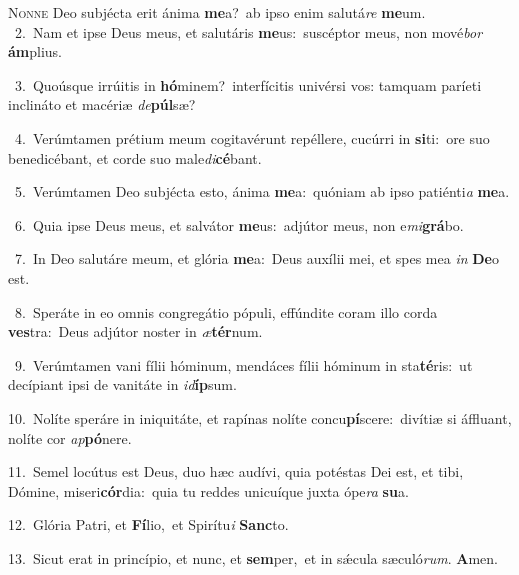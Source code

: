 \lettrine{\initial\textcolor{\initialcolor}{N}}{onne} Deo subjécta erit ánima \textbf{me}\-a?~\star ab ipso enim salutá\textit{re} \textbf{me}\-um.\\
{\numbfont\textcolor{\numbcolor}{~2.}}~Nam et ipse Deus meus, et salutáris \textbf{me}\-us:~\star suscéptor meus, non mové\textit{bor} \textbf{ám}\-plius.\par
{\numbfont\textcolor{\numbcolor}{~3.}}~Quoúsque irrúitis in \textbf{hó}\-minem?~\star interfícitis univérsi vos: tamquam paríeti inclináto et macériæ \textit{de}\-\textbf{púl}sæ?\par
{\numbfont\textcolor{\numbcolor}{~4.}}~Verúmtamen prétium meum cogitavérunt repéllere, cucúrri in \textbf{si}\-ti:~\star ore suo benedicébant, et corde suo male\-\textit{di}\-\textbf{cé}bant.\par
{\numbfont\textcolor{\numbcolor}{~5.}}~Verúmtamen Deo subjécta esto, ánima \textbf{me}\-a:~\star quóniam ab ipso patiénti\textit{a} \textbf{me}\-a.\par
{\numbfont\textcolor{\numbcolor}{~6.}}~Quia ipse Deus meus, et salvátor \textbf{me}\-us:~\star adjútor meus, non e\-\textit{mi}\-\textbf{grá}bo.\par
{\numbfont\textcolor{\numbcolor}{~7.}}~In Deo salutáre meum, et glória \textbf{me}\-a:~\star Deus auxílii mei, et spes mea \textit{in} \textbf{De}\-o est.\par
{\numbfont\textcolor{\numbcolor}{~8.}}~Speráte in eo omnis congregátio pópuli, effúndite coram illo corda \textbf{ves}\-tra:~\star Deus adjútor noster in \textit{æ}\-\textbf{tér}num.\par
{\numbfont\textcolor{\numbcolor}{~9.}}~Verúmtamen vani fílii hóminum, mendáces fílii hóminum in sta\-\textbf{té}\-ris:~\star ut decípiant ipsi de vanitáte in \textit{id}\-\textbf{íp}sum.\par
{\numbfont\textcolor{\numbcolor}{10.}}~Nolíte speráre in iniquitáte, et rapínas nolíte concu\-\textbf{pí}\-scere:~\star divítiæ si áffluant, nolíte cor \textit{ap}\-\textbf{pó}nere.\par
{\numbfont\textcolor{\numbcolor}{11.}}~Semel locútus est Deus, duo hæc audívi, quia potéstas Dei est, et tibi, Dómine, miseri\-\textbf{cór}\-dia:~\star quia tu reddes unicuíque juxta ópe\textit{ra} \textbf{su}\-a.\par
{\numbfont\textcolor{\numbcolor}{12.}}~Glória Patri, et \textbf{Fí}\-lio,~\star et Spirítu\textit{i} \textbf{Sanc}\-to.\par
{\numbfont\textcolor{\numbcolor}{13.}}~Sicut erat in princípio, et nunc, et \textbf{sem}\-per,~\star et in sǽcula sæculó\-\textit{rum}\-. \textbf{A}\-men.\par
